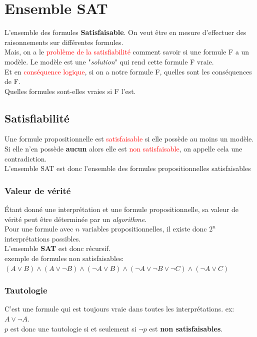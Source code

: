\documentclass{report}
\begin{document}
\section{Ensemble SAT}
L'ensemble des formules \textbf{Satisfaisable}. On veut être en mesure d'effectuer des raisonnements sur différentes formules.\\
Mais, on a le \textcolor{red}{problème de la satisfiabilité} comment savoir si une formule F a un modèle. Le modèle est une "\textit{solution}" qui rend cette formule F vraie.\\

Et en \textcolor{red}{conséquence logique}, si on a notre formule F, quelles sont les conséquences de F.\\
Quelles formules sont-elles vraies si F l'est.

\subsection{Satisfiabilité}
Une formule propositionnelle est \textcolor{red}{satisfaisable} si elle possède au moins un modèle. Si elle n'en possède \textbf{aucun} alors elle est \textcolor{red}{non satisfaisable}, on appelle cela une contradiction.\\
L'ensemble SAT est donc l'ensemble des formules propositionnelles satisfaisables
\subsubsection{Valeur de vérité}
Étant donné une interprétation et une formule propositionnelle, sa valeur de vérité peut être déterminée par un \textit{algorithme}.\\
Pour une formule avec $n$ variables propositionnelles, il existe donc $2^n$ interprétations possibles.\\
L'ensemble \textbf{SAT} est donc récursif.\\
exemple de formules non satisfaisables: $(A \vee B) \wedge (A \vee \neg B) \wedge (\neg A \vee B) \wedge ( \neg A \vee \neg B \vee \neg C) \wedge ( \neg A \vee C)$

\subsubsection{Tautologie}
C'est une formule qui est toujours vraie dans toutes les interprétations. ex: $A \vee \neg A$.\\
$p$ est donc une tautologie si et seulement si $\neg p$ est \textbf{non satisfaisables}.
\end{document}
